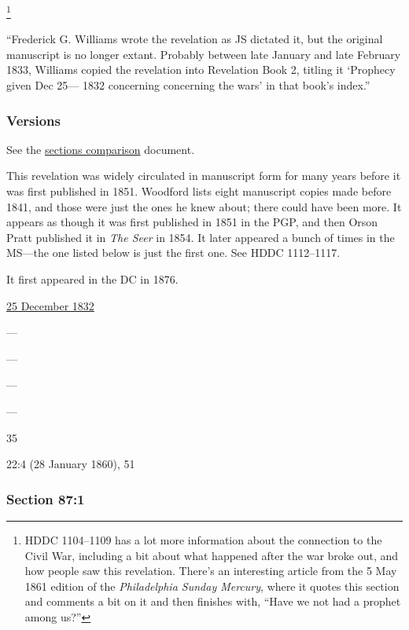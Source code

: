 				\footnote{%
					HDDC 1104--1109 has a lot more information about the connection to the Civil War, including a bit about what happened after the war broke out, and how people saw this revelation. There's an interesting article from the 5 May 1861 edition of the \textit{Philadelphia Sunday Mercury}, where it quotes this section and comments a bit on it and then finishes with, ``Have we not had a prophet among us?''
					} 
			
			``Frederick G. Williams wrote the revelation as JS dictated it, but the original manuscript is no longer extant. Probably between late January and late February 1833, Williams copied the revelation into Revelation Book 2, titling it `Prophecy given Dec 25--- 1832 concerning concerning the wars' in that book's index.''
			
	\subsubsection{Versions}
		\label{DC87-V}
		
		See the \href{https://drive.google.com/file/d/1goAvNz8jS4R8slYfMG_db55Ty2z_vmgK/view?usp=sharing}{sections comparison} document.
		
		This revelation was widely circulated in manuscript form for many years before it was first published in 1851. Woodford lists eight manuscript copies made before 1841, and those were just the ones he knew about; there could have been more. It appears as though it was first published in 1851 in the PGP, and then Orson Pratt published it in \textit{The Seer} in 1854. It later appeared a bunch of times in the MS---the one listed below is just the first one. See HDDC 1112--1117.
		
		It first appeared in the DC in 1876.
	
		\begin{compactdesc}
			\item[JSP] \hyperref[EMS-1832-JS-25-DEC-1832]{25 December 1832}
			\item[BC] ---
			\item[DC 1835] ---
			\item[TS] ---
			\item[DC 1844] ---
			\item[PGP 1851] 35
			\item[MS] 22:4 (28 January 1860), 51
		\end{compactdesc}

	\subsubsection{Section 87:1} %
		\label{DC87-1}

